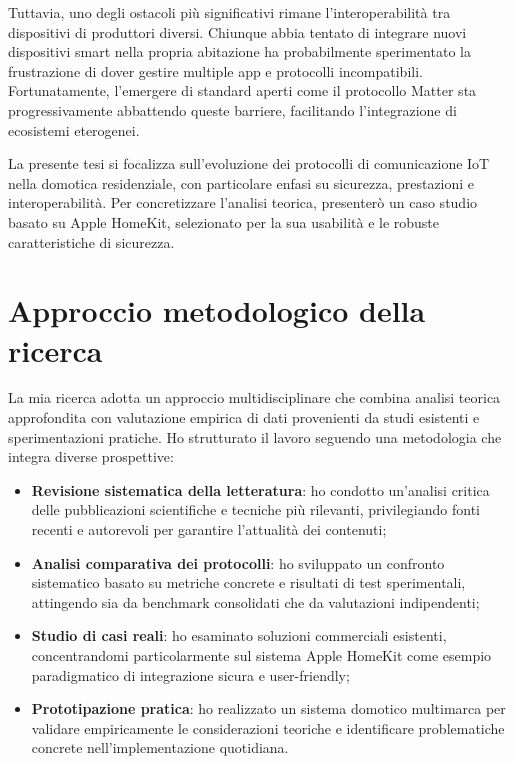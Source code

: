 \vspace{0.5cm}
Tuttavia, uno degli ostacoli più significativi rimane l'interoperabilità tra dispositivi di produttori diversi. Chiunque abbia tentato di integrare nuovi dispositivi smart nella propria abitazione ha probabilmente sperimentato la frustrazione di dover gestire multiple app e protocolli incompatibili. Fortunatamente, l'emergere di standard aperti come il protocollo Matter sta progressivamente abbattendo queste barriere, facilitando l'integrazione di ecosistemi eterogenei.

\vspace{0.5cm}
La presente tesi si focalizza sull'evoluzione dei protocolli di comunicazione IoT nella domotica residenziale, con particolare enfasi su sicurezza, prestazioni e interoperabilità. Per concretizzare l'analisi teorica, presenterò un caso studio basato su Apple HomeKit, selezionato per la sua usabilità e le robuste caratteristiche di sicurezza.

\section{Approccio metodologico della ricerca}
La mia ricerca adotta un approccio multidisciplinare che combina analisi teorica approfondita con valutazione empirica di dati provenienti da studi esistenti e sperimentazioni pratiche. Ho strutturato il lavoro seguendo una metodologia che integra diverse prospettive:

\begin{itemize}
\item \textbf{Revisione sistematica della letteratura}: ho condotto un'analisi critica delle pubblicazioni scientifiche e tecniche più rilevanti, privilegiando fonti recenti e autorevoli per garantire l'attualità dei contenuti;
\item \textbf{Analisi comparativa dei protocolli}: ho sviluppato un confronto sistematico basato su metriche concrete e risultati di test sperimentali, attingendo sia da benchmark consolidati che da valutazioni indipendenti;
\item \textbf{Studio di casi reali}: ho esaminato soluzioni commerciali esistenti, concentrandomi particolarmente sul sistema Apple HomeKit come esempio paradigmatico di integrazione sicura e user-friendly;
\item \textbf{Prototipazione pratica}: ho realizzato un sistema domotico multimarca per validare empiricamente le considerazioni teoriche e identificare problematiche concrete nell'implementazione quotidiana.
\end{itemize}

